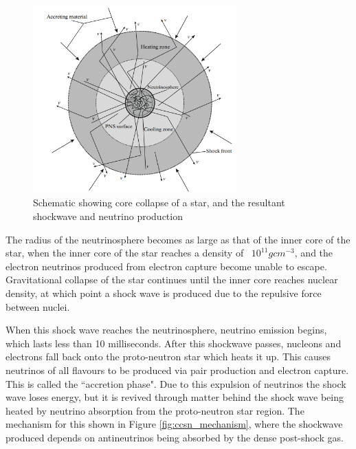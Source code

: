 \begin{figure}
    \centering
    \includegraphics[width=0.7\textwidth]{Figures/neutrinosphere.png}
    \caption{Schematic showing core collapse of a star, and the resultant shockwave and neutrino production}
    \label{fig:neutrinosphere}
\end{figure}


The radius of the neutrinosphere becomes as large as that of the inner core of the star, when the inner core of the star reaches a density of ~$10^{11} gcm^{-3}$, and the electron neutrinos produced from electron capture become unable to escape. Gravitational collapse of the star continues until the inner core reaches nuclear density, at which point a shock wave is produced due to the repulsive force between nuclei. 
\newline

When this shock wave reaches the neutrinosphere, neutrino emission begins, which lasts less than 10 milliseconds. After this shockwave passes, nucleons and electrons fall back onto the proto-neutron star which heats it up. This causes neutrinos of all flavours to be produced via pair production and electron capture. This is called the ``accretion phase". Due to this expulsion of neutrinos the shock wave loses energy, but it is revived through matter behind the shock wave being heated by neutrino absorption from the proto-neutron star region. The mechanism for this shown in Figure \ref{fig:ccsn_mechanism}, where the shockwave produced depends on antineutrinos being absorbed by the dense post-shock gas. 
\newline

